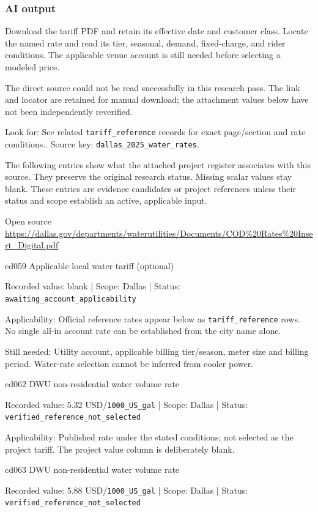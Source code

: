 \subsubsection*{AI output}
Download the tariff PDF and retain its effective date and customer class. Locate the named rate and read its tier, seasonal, demand, fixed-charge, and rider conditions. The applicable venue account is still needed before selecting a modeled price.

The direct source could not be read successfully in this research pass. The link and locator are retained for manual download; the attachment values below have not been independently reverified.

Look for: See related \nolinkurl{tariff_reference} records for exact page/section and rate conditions.. Source key: \nolinkurl{dallas_2025_water_rates}.

The following entries show what the attached project register associates with this source. They preserve the original research status. Missing scalar values stay blank. These entries are evidence candidates or project references unless their status and scope establish an active, applicable input.

Open source  \url{https://dallas.gov/departments/waterutilities/Documents/COD%20Rates%20Insert_Digital.pdf}

cd059  Applicable local water tariff (optional)

Recorded value: blank | Scope: Dallas | Status: \nolinkurl{awaiting_account_applicability}

Applicability: Official reference rates appear below as \nolinkurl{tariff_reference} rows. No single all-in account rate can be established from the city name alone.

Still needed: Utility account, applicable billing tier/season, meter size and billing period. Water-rate selection cannot be inferred from cooler power.

cd062  DWU non-residential water volume rate

Recorded value: 5.32 USD/\nolinkurl{1000_US_gal} | Scope: Dallas | Status: \nolinkurl{verified_reference_not_selected}

Applicability: Published rate under the stated conditions; not selected as the project tariff. The project value column is deliberately blank.

cd063  DWU non-residential water volume rate

Recorded value: 5.88 USD/\nolinkurl{1000_US_gal} | Scope: Dallas | Status: \nolinkurl{verified_reference_not_selected}

